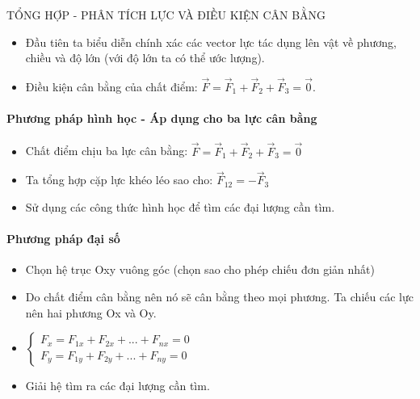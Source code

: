 \begin{dang}{TỔNG HỢP - PHÂN TÍCH LỰC VÀ ĐIỀU KIỆN CÂN BẰNG}
\begin{itemize}
\item Đầu tiên ta biểu diễn chính xác các vector lực tác dụng lên vật về phương, chiều và độ lớn (với độ lớn ta có thể ước lượng).
\item Điều kiện cân bằng của chất điểm: $\vec{F}=\vec{F}_1+\vec{F}_2+\vec{F}_3=\vec{0}$.
\end{itemize}
\paragraph{Phương pháp hình học - Áp dụng cho ba lực cân bằng}
\begin{itemize}
\item Chất điểm chịu ba lực cân bằng: $\vec{F}=\vec{F}_1+\vec{F}_2+\vec{F}_3=\vec{0}$
\item Ta tổng hợp cặp lực khéo léo sao cho: $\vec{F}_{12}=-\vec{F}_3$
\item Sử dụng các công thức hình học để tìm các đại lượng cần tìm.
\end{itemize}
\paragraph{Phương pháp đại số}
\begin{itemize}
\item Chọn hệ trục Oxy vuông góc (chọn sao cho phép chiếu đơn giản nhất)
\item Do chất điểm cân bằng nên nó sẽ cân bằng theo mọi phương. Ta chiếu các lực nên hai phương Ox và Oy. 
\item $\begin{cases}
F_x=F_{1x}+F_{2x}+...+F_{nx}=0\\
F_y=F_{1y}+F_{2y}+...+F_{ny}=0
\end{cases}$
\item Giải hệ tìm ra các đại lượng cần tìm.
\end{itemize}
\end{dang}

